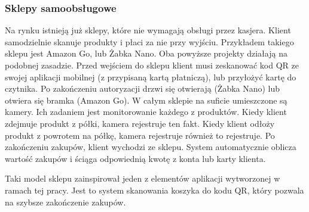 \subsubsection{Sklepy samoobsługowe}
Na rynku istnieją już sklepy, które nie wymagają obsługi przez kasjera. Klient samodzielnie skanuje produkty i płaci za nie przy wyjściu. Przykładem takiego sklepu jest Amazon Go, lub Żabka Nano. Oba powyższe projekty działają na podobnej zasadzie.
Przed wejściem do sklepu klient musi zeskanować kod QR ze swojej aplikacji mobilnej (z przypisaną kartą płatniczą), lub przyłożyć kartę do czytnika. Po zakończeniu autoryzacji drzwi się otwierają (Żabka Nano) lub otwiera się bramka (Amazon Go). W całym sklepie na suficie umieszczone są kamery.
Ich zadaniem jest monitorowanie każdego z produktów. Kiedy klient zdejmuje produkt z półki, kamera rejestruje ten fakt. Kiedy klient odłoży produkt z powrotem na półkę, kamera rejestruje również to rejestruje. Po zakończeniu zakupów, klient wychodzi ze sklepu. System automatycznie oblicza wartość zakupów i ściąga odpowiednią kwotę z konta lub karty klienta.

Taki model sklepu zainspirował jeden z elementów aplikacji wytworzonej w ramach tej pracy. Jest to system skanowania koszyka do kodu QR, który pozwala na szybsze zakończenie zakupów. 

